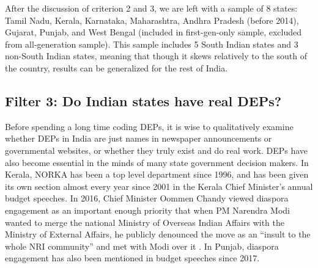 \documentclass[12pt]{article}
\let\oldsubsection\subsection
\renewcommand{\subsection}{\FloatBarrier\oldsubsection}
\begin{document}
After the discussion of criterion 2 and 3, we are left with a sample of 8 states: Tamil Nadu, Kerala, Karnataka, Maharashtra, Andhra Pradesh (before 2014), Gujarat, Punjab, and West Bengal (included in first-gen-only sample, excluded from all-generation sample). This sample includes 5 South Indian states and 3 non-South Indian states, meaning that though it skews relatively to the south of the country, results can be generalized for the rest of India.

\subsection{Filter 3: Do Indian states have real DEPs?}\label{ss:are there deps}
    Before spending a long time coding DEPs, it is wise to qualitatively examine whether DEPs in India are just names in newspaper announcements or governmental websites, or whether they truly exist and do real work. 
   DEPs have also become essential in the minds of many state government decision makers. In Kerala, NORKA has been a top level department since 1996, and has been given its own section almost every year since 2001 in the Kerala Chief Minister's annual budget speeches. In 2016, Chief Minister Oommen Chandy viewed diaspora engagement as an important enough priority that when PM Narendra Modi wanted to merge the national Ministry of Overseas Indian Affairs with the Ministry of External Affairs, he publicly denounced the move as an ``insult to the whole NRI community'' and met with Modi over it \citep{ttn_team_kerala_2016}. In Punjab, diaspora engagement has also been mentioned in budget speeches since 2017. 
\end{document}

